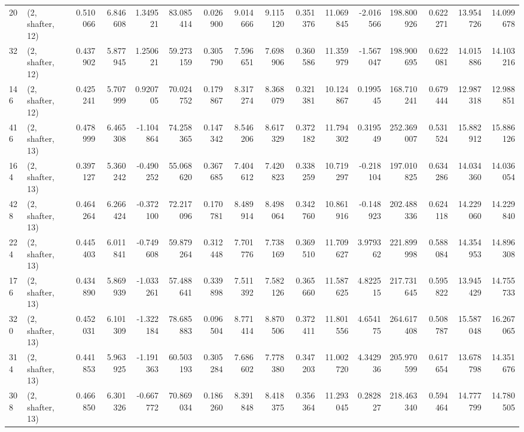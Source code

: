 \begin{tabular}{llrrrrrrrrrrrrrr}
20  &  (2, shafter, 12) &   0.510066 &   6.846608 &   1.349521 &    83.085414 &   0.026900 &   9.014666 &   9.115120 &  0.351376 &  11.069845 &  -2.016566 &   198.800926 &   0.622271 &  13.954726 &  14.099678 \\
32  &  (2, shafter, 12) &   0.437902 &   5.877945 &   1.250621 &    59.273159 &   0.305790 &   7.596651 &   7.698906 &  0.360586 &  11.359979 &  -1.567047 &   198.900695 &   0.622081 &  14.015886 &  14.103216 \\
146 &  (2, shafter, 12) &   0.425241 &   5.707999 &   0.920705 &    70.024752 &   0.179867 &   8.317274 &   8.368079 &  0.321381 &  10.124867 &   0.199545 &   168.710241 &   0.679444 &  12.987318 &  12.988851 \\
416 &  (2, shafter, 13) &   0.478999 &   6.465308 &  -1.104864 &    74.258365 &   0.147342 &   8.546206 &   8.617329 &  0.372182 &  11.794302 &   0.319549 &   252.369007 &   0.531524 &  15.882912 &  15.886126 \\
164 &  (2, shafter, 13) &   0.397127 &   5.360242 &  -0.490252 &    55.068620 &   0.367685 &   7.404612 &   7.420823 &  0.338259 &  10.719297 &  -0.218104 &   197.010825 &   0.634286 &  14.034360 &  14.036054 \\
428 &  (2, shafter, 13) &   0.464264 &   6.266424 &  -0.372100 &    72.217096 &   0.170781 &   8.489914 &   8.498064 &  0.342760 &  10.861916 &  -0.148923 &   202.488336 &   0.624118 &  14.229060 &  14.229840 \\
224 &  (2, shafter, 13) &   0.445403 &   6.011841 &  -0.749608 &    59.879264 &   0.312448 &   7.701776 &   7.738169 &  0.369510 &  11.709627 &   3.979362 &   221.899998 &   0.588084 &  14.354953 &  14.896308 \\
176 &  (2, shafter, 13) &   0.434890 &   5.869939 &  -1.033261 &    57.488641 &   0.339898 &   7.511392 &   7.582126 &  0.365660 &  11.587625 &   4.822515 &   217.731645 &   0.595822 &  13.945429 &  14.755733 \\
320 &  (2, shafter, 13) &   0.452031 &   6.101309 &  -1.322184 &    78.685883 &   0.096504 &   8.771414 &   8.870506 &  0.372411 &  11.801556 &   4.654175 &   264.617408 &   0.508787 &  15.587048 &  16.267065 \\
314 &  (2, shafter, 13) &   0.441853 &   5.963925 &  -1.191363 &    60.503193 &   0.305284 &   7.686602 &   7.778380 &  0.347203 &  11.002720 &   4.342936 &   205.970599 &   0.617654 &  13.678798 &  14.351676 \\
308 &  (2, shafter, 13) &   0.466850 &   6.301326 &  -0.667772 &    70.869034 &   0.186260 &   8.391848 &   8.418375 &  0.356364 &  11.293045 &   0.282827 &   218.463340 &   0.594464 &  14.777799 &  14.780505 \\

\end{tabular}

